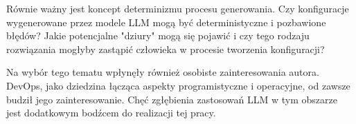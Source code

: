 Równie ważny jest koncept determinizmu procesu generowania. Czy konfiguracje wygenerowane przez modele LLM mogą być deterministyczne i pozbawione błędów? Jakie potencjalne "dziury" mogą się pojawić i czy tego rodzaju rozwiązania mogłyby zastąpić człowieka w procesie tworzenia konfiguracji?

Na wybór tego tematu wpłynęły również osobiste zainteresowania autora. DevOps, jako dziedzina łącząca aspekty programistyczne i operacyjne, od zawsze budził jego zainteresowanie. Chęć zgłębienia zastosowań LLM w tym obszarze jest dodatkowym bodźcem do realizacji tej pracy.

